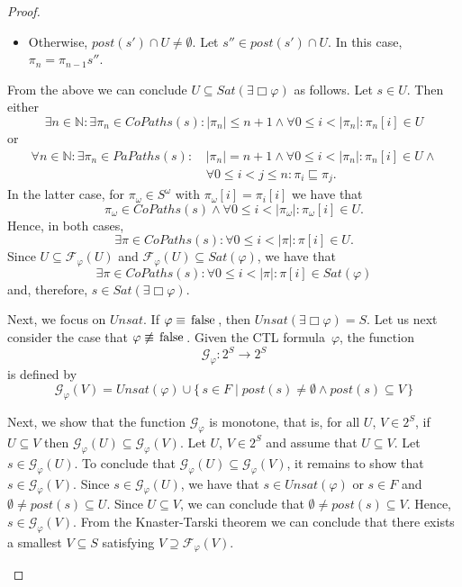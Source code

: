 \documentclass[12pt]{article}
\newcommand{\always}{\Box}
\newcommand{\FALSE}{\mbox{\lstinline{false}}}
\theoremstyle{definition}
\newenvironment{franck}{\color{red}}{\color{black}}
\begin{document}
\begin{proof}
\begin{itemize}
\begin{franck}
\begin{itemize}
\begin{itemize}
\begin{itemize}
\item
Otherwise, $\mathit{post}(s') \cap U \not= \emptyset$.  Let $s'' \in \mathit{post}(s') \cap U$.  In this case, $\pi_n = \pi_{n-1} s''$.
\end{itemize}
\end{itemize}
\end{itemize}
From the above we can conclude $U \subseteq \mathit{Sat}(\exists \always \varphi)$ as follows.  Let $s \in U$.  Then either
\[
\exists n \in \mathbb{N} : \exists \pi_n \in \mathit{CoPaths}(s) : |\pi_n| \leq n + 1 \wedge\forall 0 \leq i < |\pi_n| : \pi_n[i] \in U
\]
or
\begin{align*}
\forall n \in \mathbb{N} : \exists \pi_n \in \mathit{PaPaths}(s) :\, & |\pi_n| = n + 1 \wedge \forall 0 \leq i < |\pi_n| : \pi_n[i] \in U \wedge\\
& \forall 0 \leq i < j \leq n: \pi_i \sqsubseteq \pi_j.
\end{align*}
In the latter case, for $\pi_{\omega} \in S^{\omega}$ with $\pi_{\omega}[i] = \pi_i[i]$ we have that 
\[
\pi_{\omega} \in \mathit{CoPaths}(s) \wedge \forall 0 \leq i < |\pi_{\omega}| : \pi_{\omega}[i] \in U.
\]
Hence, in both cases,
\[
\exists \pi \in \mathit{CoPaths}(s) : \forall 0 \leq i < |\pi| : \pi[i] \in U.
\]
Since $U \subseteq \mathcal{F}_{\varphi}(U)$ and $\mathcal{F}_{\varphi}(U) \subseteq \mathit{Sat}(\varphi)$, we have that 
\[
\exists \pi \in \mathit{CoPaths}(s) : \forall 0 \leq i < |\pi| : \pi[i] \in \mathit{Sat}(\varphi)
\]
and, therefore, $s \in \mathit{Sat}(\exists \always \varphi)$.

Next, we focus on $\mathit{Unsat}$.  If $\varphi \equiv \FALSE$, then $\mathit{Unsat}(\exists \always \varphi) = S$.  Let us next consider the case that $\varphi \not\equiv \FALSE$.  Given the CTL formula~$\varphi$, the function
\[
\mathcal{G}_{\varphi} : 2^S \to 2^S
\]
is defined by
\[
\mathcal{G}_{\varphi}(V) = 
\mathit{Unsat}(\varphi) \cup \{\, s \in F \mid \mathit{post}(s) \not= \emptyset \wedge \mathit{post}(s) \subseteq V \,\}
\]

Next, we show that the function $\mathcal{G}_{\varphi}$ is monotone, that is, for all $U$, $V \in 2^S$, if $U \subseteq V$ then $\mathcal{G}_{\varphi}(U) \subseteq \mathcal{G}_{\varphi}(V)$.  Let $U$, $V \in 2^S$ and assume that $U \subseteq V$.  Let $s \in \mathcal{G}_{\varphi}(U)$. To conclude that $\mathcal{G}_{\varphi}(U) \subseteq \mathcal{G}_{\varphi}(V)$, it remains to show that $s \in \mathcal{G}_{\varphi}(V)$.  Since $s \in \mathcal{G}_{\varphi}(U)$, we have that $s \in \mathit{Unsat}(\varphi)$ or $s \in F$ and $\emptyset \not= \mathit{post}(s) \subseteq U$.  Since $U \subseteq V$, we can conclude that $\emptyset \not= \mathit{post}(s) \subseteq V$.  Hence, $s \in \mathcal{G}_{\varphi}(V)$.  From the Knaster-Tarski theorem we can conclude that there exists a smallest $V \subseteq S$ satisfying $V \supseteq \mathcal{F}_{\varphi}(V)$.


\end{franck}
\end{itemize}
\end{proof}
\end{document}
